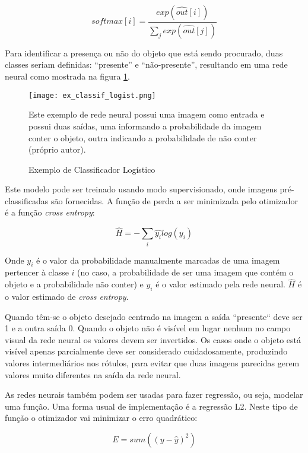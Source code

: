 \begin{equation}
	softmax[i] = \frac
		{exp\left( \widehat{out}[i] \right)}
		{\sum_j exp\left( \widehat{out}[j] \right)}
\end{equation}

Para identificar a presença ou não do objeto que está sendo procurado, duas
classes seriam definidas: ``presente'' e ``não-presente'', resultando em uma rede
neural como mostrada na figura \ref{fig:ex_classif_logist}.

\begin{figure}[!htb]
	\centering
	\texttt{[image: ex\_classif\_logist.png]}
	\caption{Exemplo de Classificador Logístico}
	\label{fig:ex_classif_logist}
	Este exemplo de rede neural possui uma imagem como entrada e possui duas
	saídas, uma informando a probabilidade da imagem conter o objeto, outra
	indicando a probabilidade de não conter (próprio autor).
\end{figure}

Este modelo pode ser treinado usando modo supervisionado, onde imagens
pré-classificadas são fornecidas. A função de perda a ser minimizada pelo
otimizador é a função \emph{cross entropy}:

\begin{equation}
	\widehat{H} = - \sum_i \widehat{y_i} log(y_i)
\end{equation}

Onde $y_i$ é o valor da probabilidade manualmente
marcadas de uma imagem pertencer à classe $i$ (no caso, a probabilidade de ser
uma imagem que contém o objeto e a probabilidade não conter) e $\widehat{y_i}$
é o valor estimado pela rede neural. $\widehat{H}$ é o valor estimado de
\emph{cross entropy}.

Quando têm-se o objeto desejado centrado na imagem a saída ``presente`` deve
ser 1 e a outra saída 0. Quando o objeto não é visível em lugar nenhum no campo
visual da rede neural os valores devem ser invertidos.
Os casos onde o objeto está visível apenas parcialmente deve ser considerado
cuidadosamente, produzindo valores intermediários nos rótulos, para evitar que
duas imagens parecidas gerem valores muito diferentes na saída da rede neural.

As redes neurais também podem ser usadas para fazer regressão, ou seja, modelar
uma função. Uma forma usual de implementação é a regressão L2. Neste tipo de
função o otimizador vai minimizar o erro quadrático:

\begin{equation}
	E=sum \left( \left( y - \widehat{y} \right)^2 \right)
\end{equation}

